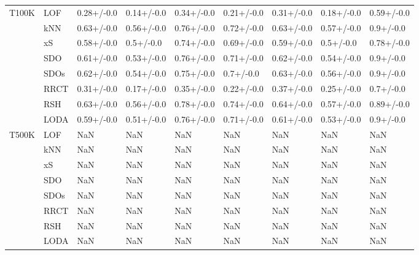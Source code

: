 \begin{table}
\begin{tabular}{lllllllll}
T100K & LOF &  0.28+/-0.0 &  0.14+/-0.0 &  0.34+/-0.0 &  0.21+/-0.0 &  0.31+/-0.0 &   0.18+/-0.0 &   0.59+/-0.0 \\
      & kNN &  0.63+/-0.0 &  0.56+/-0.0 &  0.76+/-0.0 &  0.72+/-0.0 &  0.63+/-0.0 &   0.57+/-0.0 &    0.9+/-0.0 \\
      & xS &  0.58+/-0.0 &   0.5+/-0.0 &  0.74+/-0.0 &  0.69+/-0.0 &  0.59+/-0.0 &    0.5+/-0.0 &   0.78+/-0.0 \\
      & SDO &  0.61+/-0.0 &  0.53+/-0.0 &  0.76+/-0.0 &  0.71+/-0.0 &  0.62+/-0.0 &   0.54+/-0.0 &    0.9+/-0.0 \\
      & SDOs &  0.62+/-0.0 &  0.54+/-0.0 &  0.75+/-0.0 &   0.7+/-0.0 &  0.63+/-0.0 &   0.56+/-0.0 &    0.9+/-0.0 \\
      & RRCT &  0.31+/-0.0 &  0.17+/-0.0 &  0.35+/-0.0 &  0.22+/-0.0 &  0.37+/-0.0 &   0.25+/-0.0 &    0.7+/-0.0 \\
      & RSH &  0.63+/-0.0 &  0.56+/-0.0 &  0.78+/-0.0 &  0.74+/-0.0 &  0.64+/-0.0 &   0.57+/-0.0 &   0.89+/-0.0 \\
      & LODA &  0.59+/-0.0 &  0.51+/-0.0 &  0.76+/-0.0 &  0.71+/-0.0 &  0.61+/-0.0 &   0.53+/-0.0 &    0.9+/-0.0 \\
T500K & LOF &         NaN &         NaN &         NaN &         NaN &         NaN &          NaN &          NaN \\
      & kNN &         NaN &         NaN &         NaN &         NaN &         NaN &          NaN &          NaN \\
      & xS &         NaN &         NaN &         NaN &         NaN &         NaN &          NaN &          NaN \\
      & SDO &         NaN &         NaN &         NaN &         NaN &         NaN &          NaN &          NaN \\
      & SDOs &         NaN &         NaN &         NaN &         NaN &         NaN &          NaN &          NaN \\
      & RRCT &         NaN &         NaN &         NaN &         NaN &         NaN &          NaN &          NaN \\
      & RSH &         NaN &         NaN &         NaN &         NaN &         NaN &          NaN &          NaN \\
      & LODA &         NaN &         NaN &         NaN &         NaN &         NaN &          NaN &          NaN \\
\bottomrule
\end{tabular}
\end{table}
